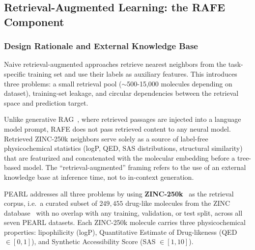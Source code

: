 \documentclass[pdflatex,sn-mathphys-num,Numbered]{sn-jnl}%
\providecommand{\DIFaddbegin}{} %
\providecommand{\DIFaddend}{} %
\providecommand{\DIFaddincludegraphics}[2][]{{\color{blue}\fbox{\DIFOincludegraphics[#1]{#2}}}} %
\DeclareRobustCommand{\DIFaddbegin}{\DIFOaddbegin \let\includegraphics\DIFaddincludegraphics} %
\DeclareRobustCommand{\DIFaddend}{\DIFOaddend \let\includegraphics\DIFOincludegraphics} %
\begin{document}
\DIFaddbegin \FloatBarrier
\DIFaddend \subsection{Retrieval-Augmented Learning: the RAFE Component}\label{sec:rafe}

\subsubsection{Design Rationale and External Knowledge Base}\label{sec:zinc_rationale}
Naive retrieval-augmented approaches retrieve nearest neighbors from the task-specific training set and use their labels as auxiliary features. This introduces three problems: a small retrieval pool ($\sim$500-15,000 molecules depending on dataset), training-set leakage, and circular dependencies between the retrieval space and prediction target.

Unlike generative RAG~\cite{lewis2020rag}, where retrieved passages are injected into a language model prompt, RAFE does not pass retrieved content to any neural model. Retrieved ZINC-250k neighbors serve solely as a source of label-free physicochemical statistics (logP, QED, SAS distributions, structural similarity) that are featurized and concatenated with the molecular embedding before a tree-based model. The ``retrieval-augmented'' framing refers to the use of an external knowledge base at inference time, not to in-context generation.

PEARL addresses all three problems by using \textbf{ZINC-250k}~\cite{gomez2018automatic} as the retrieval corpus, i.e.\ a curated subset of $249,455$ drug-like molecules from the ZINC database~\cite{irwin2020zinc20} with no overlap with any training, validation, or test split, across all seven PEARL datasets. Each ZINC-250k molecule carries three physicochemical properties: lipophilicity (logP), Quantitative Estimate of Drug-likeness (QED $\in [0,1]$), and Synthetic Accessibility Score (SAS $\in [1,10]$).
\end{document}
